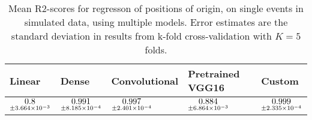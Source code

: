 \begin{table}
\centering
\caption{
Mean R2-scores for regresson of positions of origin, on single events in simulated data, using multiple models. 
Error estimates are the standard deviation in results from k-fold cross-validation 
with $K=5$ folds.
}
\label{tab:regression-simulated-single-position-r2}
\begin{tabular}{lllll}
\toprule
                                           Linear &                                               Dense &                                       Convolutional &                                    Pretrained VGG16 &                                              Custom \\
\midrule
 $\underset{\num{+- 3.664e-03 }  }{\num{ 0.8 } }$ &  $\underset{\num{+- 8.185e-04 }  }{\num{ 0.991 } }$ &  $\underset{\num{+- 2.401e-04 }  }{\num{ 0.997 } }$ &  $\underset{\num{+- 6.864e-03 }  }{\num{ 0.884 } }$ &  $\underset{\num{+- 2.335e-04 }  }{\num{ 0.999 } }$ \\
\bottomrule
\end{tabular}
\end{table}
